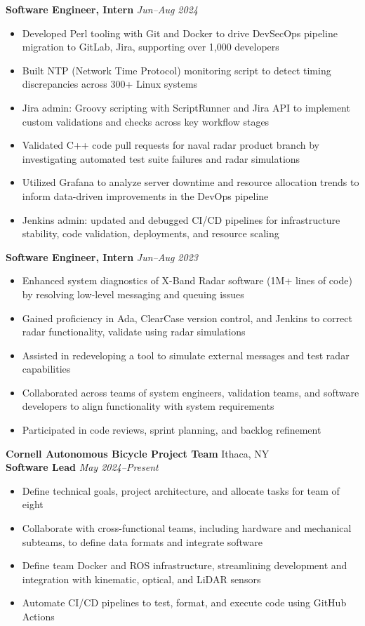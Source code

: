 \documentclass[letterpaper,10pt]{article}
\newcommand{\company}[2]{
    \vspace{7pt}
    {\large \textbf{#1}}
    \hfill
    {\normalsize {#2}}
    \\
}
\newcommand{\position}[2]{
    \vspace{5pt}
    {\normalsize \textbf {#1}}
    \hfill
    {\normalsize \textit{#2}}
    \\
}
\newcommand{\itemsBegin}{
    \begin{itemize}[leftmargin=0.2in, labelsep=0.05in, itemsep=0pt, parsep=1pt, topsep=0pt, partopsep=0pt]
    \small
}
\newcommand{\itemsEnd}{\end{itemize}}
\begin{document}
    \position{Software Engineer, Intern}{Jun--Aug 2024}
    \itemsBegin{}
        \item Developed Perl tooling with Git and Docker to drive DevSecOps pipeline migration to GitLab, Jira, supporting over 1,000 developers
        \item Built NTP (Network Time Protocol) monitoring script to detect timing discrepancies across 300+ Linux systems
        \item Jira admin: Groovy scripting with ScriptRunner and Jira API to implement custom validations and checks across key workflow stages
        \item Validated C++ code pull requests for naval radar product branch by investigating automated test suite failures and radar simulations
        \item Utilized Grafana to analyze server downtime and resource allocation trends to inform data-driven improvements in the DevOps pipeline
        \item Jenkins admin: updated and debugged CI/CD pipelines for infrastructure stability, code validation, deployments, and resource scaling
    \itemsEnd{}

    \position{Software Engineer, Intern}{Jun--Aug 2023}
    \itemsBegin{}
        \item Enhanced system diagnostics of X-Band Radar software (1M+ lines of code) by resolving low-level messaging and queuing issues
        \item Gained proficiency in Ada, ClearCase version control, and Jenkins to correct radar functionality, validate using radar simulations
        \item Assisted in redeveloping a tool to simulate external messages and test radar capabilities
        \item Collaborated across teams of system engineers, validation teams, and software developers to align functionality with system requirements
        \item Participated in code reviews, sprint planning, and backlog refinement
    \itemsEnd{}

    \company{Cornell Autonomous Bicycle Project Team}{Ithaca, NY}

    \position{Software Lead}{May 2024--Present}
    \itemsBegin{}
        \item Define technical goals, project architecture, and allocate tasks for team of eight
        \item Collaborate with cross-functional teams, including hardware and mechanical subteams, to define data formats and integrate software
        \item Define team Docker and ROS infrastructure, streamlining development and integration with kinematic, optical, and LiDAR sensors
        \item Automate CI/CD pipelines to test, format, and execute code using GitHub Actions
    \itemsEnd{}
\end{document}
